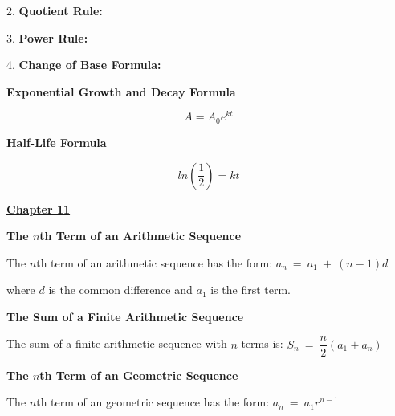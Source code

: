 \documentclass{article}
\begin{document}
\begin{large}
2. \textbf{Quotient Rule:} 

3. \textbf{Power Rule:} 

4. \textbf{Change of Base Formula:} 

\vspace{0.2in}
\textbf{Exponential Growth and Decay Formula}

\hspace{0.1in} {\Large\vspace{-0.3in} \[A = A_0 e^{kt}\]}

\textbf{Half-Life Formula}

\hspace{0.1in} {\vspace{-0.5in}\Large\[ln(\dfrac{1}{2})=kt\]}

\vspace{-0.1in}

\underline{\textbf{\huge Chapter 11 \phantom{ } \phantom{ } \phantom{ } \phantom{ }}}

\textbf{The $n$th Term of an Arithmetic Sequence}

\hspace{0.1in} The $n$th term of an arithmetic sequence has the form:
\vspace{-0.1in}
\hspace{1.0in} $a_{n}\ =\ a_{1}\ +\ (n-1)d$

\vspace{-0.2in}
\hspace{0.1in} where $d$ is the common difference and $a_{1}$ is the first term.

\textbf{The Sum of a Finite Arithmetic Sequence}

\hspace{0.1in} The sum of a finite arithmetic sequence with $n$ terms is:
\hspace{0.8in} $S_{n}\ =\ \dfrac{n}{2}(a_{1} + a_{n})$

\vspace{-0.1in}
\textbf{The $n$th Term of an Geometric Sequence}

\vspace{-0.1in}
\hspace{0.1in} The $n$th term of an geometric sequence has the form:
\hspace{1.0in} $a_{n}\ =\ a_{1}r^{n-1}$


\end{large}
\end{document}
